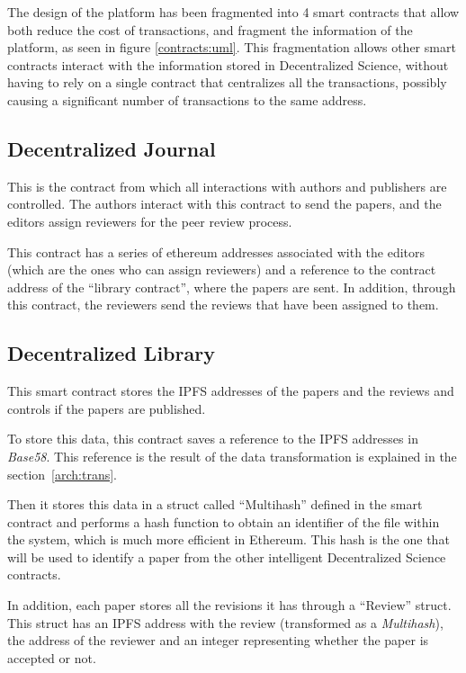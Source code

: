 
The design of the platform has been fragmented into 4 smart contracts that allow
both reduce the cost of transactions, and fragment the information of the
platform, as seen in figure \ref{contracts:uml}. This fragmentation allows other
smart contracts interact with the information stored in Decentralized Science,
without having to rely on a single contract that centralizes all the
transactions, possibly causing a significant number of transactions to the same
address.

\subsection*{Decentralized Journal}%

This is the contract from which all interactions with authors and publishers are
controlled. The authors interact with this contract to send the papers, and the
editors assign reviewers for the peer review process.

This contract has a series of ethereum addresses associated with the editors
(which are the ones who can assign reviewers) and a reference to the contract
address of the ``library contract'', where the papers are sent. In addition,
through this contract, the reviewers send the reviews that have been assigned to
them.

\subsection*{Decentralized Library}

This smart contract stores the IPFS addresses of the papers and the reviews and
controls if the papers are published.

To store this data, this contract saves a reference to the IPFS addresses in
\emph{Base58}. This reference is the result of the data transformation is
explained in the section~\ref{arch:trans}.

Then it stores this data in a struct called ``Multihash'' defined in the smart
contract and performs a hash function to obtain an identifier of the file within
the system, which is much more efficient in Ethereum. This hash is the one that
will be used to identify a paper from the other intelligent Decentralized
Science contracts.

In addition, each paper stores all the revisions it has through a ``Review''
struct. This struct has an IPFS address with the review (transformed as a
\emph{Multihash}), the address of the reviewer and an integer representing
whether the paper is accepted or not.

